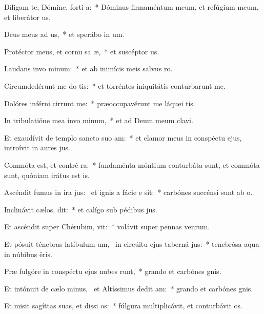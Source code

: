 \item Díligam te, Dómine, forti a:~* Dóminus firmaméntum meum, et refúgium meum, et liberátor us.
\item Deus meus ad us,~* et sperábo in um.
\item Protéctor meus, et cornu sa æ,~* et suscéptor us.
\item Laudans invo minum:~* et ab inimícis meis salvus ro.
\item Circumdedérunt me do tis:~* et torréntes iniquitátis conturbarunt me.
\item Dolóres inférni cirrunt me:~* præoccupavérunt me láquei tis.
\item In tribulatióne mea invo minum,~* et ad Deum meum clavi.
\item Et exaudívit de templo sancto suo  am:~* et clamor meus in conspéctu ejus, introívit in aures jus.
\item Commóta est, et contré ra:~* fundaménta móntium conturbáta sunt, et commóta sunt, quóniam irátus est is.
\item Ascéndit fumus in ira jus:~\pscross{} et ignis a fácie e sit:~* carbónes succénsi sunt ab o.
\item Inclinávit cælos,  dit:~* et calígo sub pédibus jus.
\item Et ascéndit super Chérubim,  vit:~* volávit super pennas venrum.
\item Et pósuit ténebras latíbulum um,~\pscross{} in circúitu ejus taberná jus:~* tenebrósa aqua in núbibus ëris.
\item Præ fulgóre in conspéctu ejus nubes runt,~* grando et carbónes gnis.
\item Et intónuit de cælo minus,~\pscross{} et Altíssimus dedit  am:~* grando et carbónes gnis.
\item Et misit sagíttas suas, et dissi os:~* fúlgura multiplicávit, et conturbávit os.
